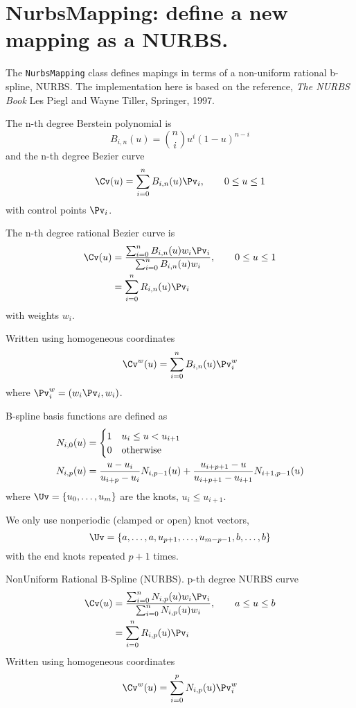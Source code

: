\section{NurbsMapping: define a new mapping as a NURBS.}

The {\tt NurbsMapping} class defines mapings in terms of a non-uniform
rational b-spline, NURBS.
The implementation here is based on the reference, {\sl The NURBS Book}
Les Piegl and Wayne Tiller, Springer, 1997. 

The n-th degree Berstein polynomial is
\[
     B_{i,n}(u) = \binom{n}{i} u^i (1-u)^{n-i}
\]
and the n-th degree Bezier curve
\[
    \Cv(u) = \sum_{i=0}^n B_{i,n}(u) \Pv_i , \qquad 0\le u \le 1
\]
with control points $\Pv_i$.

The n-th degree rational Bezier curve is
\begin{align*}
    \Cv(u) &= { \sum_{i=0}^n B_{i,n}(u) w_i \Pv_i  \over \sum_{i=0}^n B_{i,n}(u) w_i } , \qquad 0\le u \le 1 \\
           &= \sum_{i=0}^n R_{i,n}(u) \Pv_i  
\end{align*}
with weights $w_i$.

Written using homogeneous coordinates
\[
    \Cv^w(u) = \sum_{i=0}^n B_{i,n}(u) \Pv^w_i  
\]
where $\Pv^w_i=(w_i\Pv_i,w_i)$.

B-spline basis functions are defined as
\begin{align*}
   N_{i,0}(u) &= \begin{cases} 1 & u_i \le u < u_{i+1} \\
                           0 & \text{otherwise} 
              \end{cases} \\
   N_{i,p}(u) &= {u-u_i \over u_{i+p} - u_i } N_{i,p-1}(u) + {u_{i+p+1}-u  \over u_{i+p+1} - u_{i+1} } N_{i+1,p-1}(u)
\end{align*}
where $\Uv=\{ u_0,\ldots,u_m\}$ are the knots, $u_i\le u_{i+1}$.

We only use nonperiodic (clamped or open) knot vectors,
\[
   \Uv =\{ a,\ldots,a, u_{p+1},\ldots,u_{m-p-1},b,\ldots,b \}
\]
with the end knots repeated $p+1$ times.

NonUniform Rational B-Spline (NURBS). p-th degree NURBS curve
\begin{align*}
    \Cv(u) &= { \sum_{i=0}^n N_{i,p}(u) w_i \Pv_i  \over \sum_{i=0}^n N_{i,p}(u) w_i} , \qquad a\le u \le b\\
           &= \sum_{i=0}^n R_{i,p} (u) \Pv_i  
\end{align*}
Written using homogeneous coordinates
\[
    \Cv^w(u) = \sum_{i=0}^p N_{i,p}(u) \Pv^w_i  
\]


